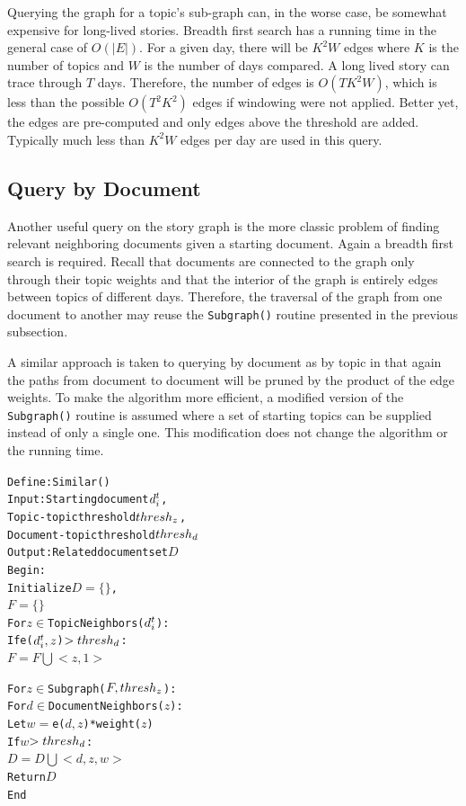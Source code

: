 \documentclass[10pt,twocolumn]{article}
\begin{document}
Querying the graph for a topic's sub-graph can, in the worse case, be somewhat expensive for long-lived stories.  Breadth first search has a running time in the general case of $O(|E|)$.  For a given day, there will be $K^2W$ edges where $K$ is the number of topics and $W$ is the number of days compared.  A long lived story can trace through $T$ days.  Therefore, the number of edges is $O(TK^2W)$, which is less than the possible $O(T^2K^2)$ edges if windowing were not applied.  Better yet, the edges are pre-computed and only edges above the threshold are added. Typically much less than $K^2W$ edges per day are used in this query.

\subsection {Query by Document}
Another useful query on the story graph is the more classic problem of finding relevant neighboring documents given a starting document.  Again a breadth first search is required.  Recall that documents are connected to the graph only through their topic weights and that the interior of the graph is entirely edges between topics of different days.  Therefore, the traversal of the graph from one document to another may reuse the \texttt{Subgraph()} routine presented in the previous subsection.

A similar approach is taken to querying by document as by topic in that again the paths from document to document will be pruned by the product of the edge weights. To make the algorithm more efficient, a modified version of the \texttt{Subgraph()} routine is assumed where a set of starting topics can be supplied instead of only a single one.  This modification does not change the algorithm or the running time.

\begin{framed}
\begin{center}
\begin{alltt}
Define: Similar()
Input:  Starting document \(d\sb{i}\sp{t}\), 
        Topic-topic threshold \(thresh\sb{z}\),
        Document-topic threshold \(thresh\sb{d}\)
Output: Related document set \(D\)
Begin:
  Initialize \(D = \{\}\),             
             \(F = \{\}\)
  For \(z \in\) TopicNeighbors(\(d\sb{i}\sp{t}\)):
    If e(\(d\sb{i}\sp{t}, z\)) \(> thresh\sb{d}\):
      \(F = F \bigcup <z, 1>\)

  For \(z \in\) Subgraph(\(F, thresh\sb{z}\)):
    For \(d \in\) DocumentNeighbors(\(z\)):
      Let \(w = \)e(\(d, z\))*weight(\(z\))
      If \(w\) \(> thresh\sb{d}\):
        \(D = D \bigcup <d, z, w>\)
  Return \(D\)
End
\end{alltt}
\end{center}
\end{framed}
\end{document}

